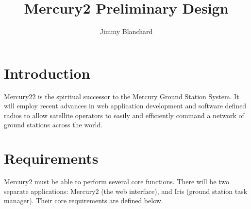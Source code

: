 \documentclass{mxl-note}
\begin{document}
\title{Mercury2 Preliminary Design}
\author{Jimmy Blanchard}
\setcounter{secnumdepth}{5}

\maketitle
\tableofcontents
\newpage 

\section{Introduction}

Mercury22 is the spiritual successor to the Mercury Ground Station System. It will employ recent advances in web application development and software defined radios to allow satellite operators to easily and efficiently command a network of ground stations across the world.

\section{Requirements}

Mercury2 must be able to perform several core functions. There will be two separate applications: Mercury2 (the web interface), and Iris (ground station task manager). Their core requirements are defined below.
\end{document}
